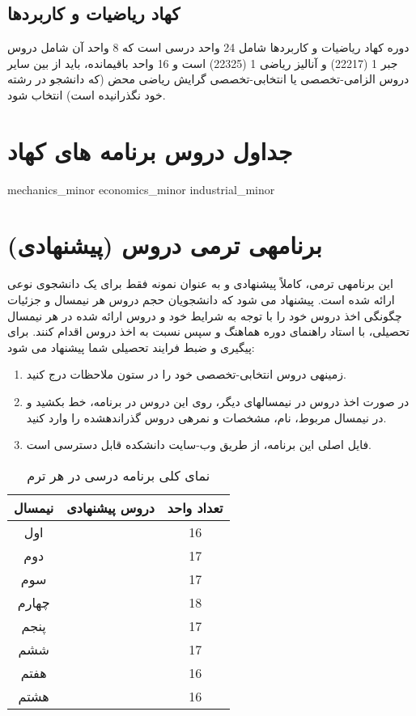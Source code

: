 \documentclass{article}
\begin{document}
\subsection{
کهاد ریاضیات و کاربردها
}
دوره کهاد ریاضیات و کاربردها شامل 24 واحد درسی است که 8 واحد آن شامل دروس جبر 1 (22217) و آنالیز ریاضی 1 (22325) است و 16 واحد باقیمانده، باید از بین سایر دروس الزامی-تخصصی یا انتخابی-تخصصی گرایش ریاضی محض (که دانشجو در رشته خود نگذرانیده است) انتخاب شود.

\section{جداول دروس برنامه های کهاد}

{mechanics_minor}
{economics_minor}
{industrial_minor}

\pagebreak
\section{
برنامهی ترمی دروس (پیشنهادی)
}
این برنامهی ترمی، کاملاً پیشنهادی و به عنوان نمونه فقط برای یک دانشجوی نوعی ارائه شده است. پیشنهاد می شود که دانشجویان حجم دروس هر نیمسال و جزئیات چگونگی اخذ دروس خود را با توجه به شرایط خود و دروس ارائه شده در هر نیمسال تحصیلی، با استاد راهنمای دوره هماهنگ و سپس نسبت به اخذ دروس اقدام کنند.
برای پیگیری و ضبط فرایند تحصیلی شما پیشنهاد می شود:
\begin{enumerate}
	

\item
 زمینهی دروس انتخابی-تخصصی خود را در ستون ملاحظات درج کنید.
\item
 در صورت اخذ دروس در نیمسالهای دیگر، روی این دروس در برنامه، خط بکشید و در نیمسال مربوط، نام، مشخصات و نمرهی دروس گذراندهشده را وارد کنید.
\item
 فایل اصلی این برنامه، از طریق وب-سایت دانشکده قابل دسترسی است.
\end{enumerate}

\begin{table}[H]
 \begin{center}
 \begin{tabular}{|c|p{9cm}|c|}
 	\hline
 	نیمسال & 
 			دروس پیشنهادی 

 	& تعداد واحد \\
 	\hline
 	اول &  & 16 \\
 	\hline
 	دوم &  & 17 \\
 	\hline
 	سوم &  & 17 \\
 	\hline
 	 چهارم &  & 18 \\
 	\hline
 	پنجم &  & 17 \\
 	\hline
 	ششم &  & 17 \\
 	\hline
 	هفتم &  & 16 \\
 	\hline
 	هشتم &  & 16 \\
 	\hline
 \end{tabular}
\caption{\label{cs-t5}
نمای کلی برنامه درسی در هر ترم
}
\end{center}
\end{table}
\end{document}
